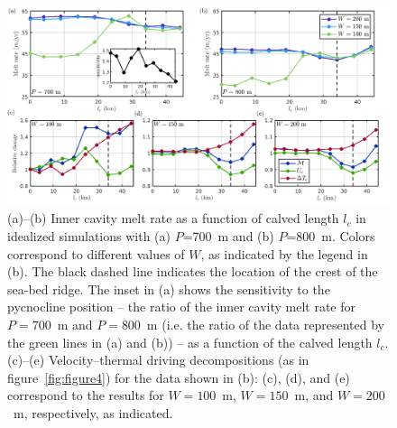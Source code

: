 \documentclass[draft]{agujournal2019}
\begin{document}
\begin{figure}
    \centering
    \includegraphics[width = \textwidth]{../make_figures/plots/figure8.png}
    \caption{(a)--(b) Inner cavity melt rate as a function of calved length $l_c$ in idealized simulations with (a) $P$=700~m and (b) $P$=800~m. Colors correspond to different values of $W$, as indicated by the legend in (b). The black dashed line indicates the location of the crest of the sea-bed ridge. The inset in (a) shows the sensitivity to the pycnocline position -- the ratio of the inner cavity melt rate for $P = 700$~m and $P = 800$~m (i.e. the ratio of the data represented by the green lines in (a) and (b)) -- as a function of the calved length $l_c$. (c)--(e) Velocity--thermal driving decompositions (as in figure~\ref{fig:figure4}) for the data shown in (b): (c), (d), and (e) correspond to the results for $W=100$~m, $W=150$~m, and $W=200$~m, respectively, as indicated.}
    \label{fig:figure8}
\end{figure}
\end{document}
